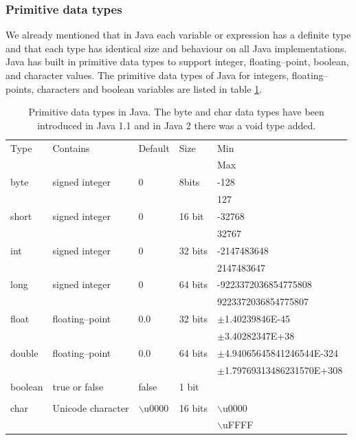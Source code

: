 \subsubsection{Primitive data types}
\label{sec:primitive_data_types}
We already mentioned that in Java each variable or expression has a
definite type and that each type has identical size and behaviour on
all Java implementations.  Java has built in primitive data types
to support integer, floating--point, boolean, and character values.
The primitive data types of Java for integers, floating--points,
characters and boolean variables are listed in table
\ref{table:primitivedata}.
\begin{table}[htbp]
\label{table:primitivedata}
\begin{center}
\begin{tabular}{l|l|l|l|l}
Type & Contains & Default & Size & Min \\
     &          &         &      & Max \\ \hline \hline
byte  & signed integer & 0 & 8bits & -128  \\
&&& & 127    \\ \hline
short & signed integer & 0 & 16 bit &-32768 \\
&&& & 32767 \\ \hline
int &   signed integer & 0 & 32 bits&-2147483648 \\
&&& &2147483647 \\ \hline
long & signed integer & 0 & 64 bits &-9223372036854775808\\
&&& &9223372036854775807\\ \hline
float & floating--point & 0.0 & 32 bits &$\pm$1.40239846E-45\\
&&& &$\pm$3.40282347E+38\\ \hline
double & floating--point & 0.0 & 64 bits &$\pm$4.94065645841246544E-324\\
&&& &$\pm$1.79769313486231570E+308\\ \hline
boolean & true or false      &  false & 1 bit&\\
&&&       &  \\ \hline
char  & Unicode character & $\backslash$u0000 & 16 bits & $\backslash$u0000 \\
&&& &$\backslash$uFFFF   \\ \hline
\end{tabular}
\end{center}
\caption{Primitive data types in Java. The byte and char data types have
  been introduced in Java 1.1 and in Java 2 there was a void type added.}
\end{table}



